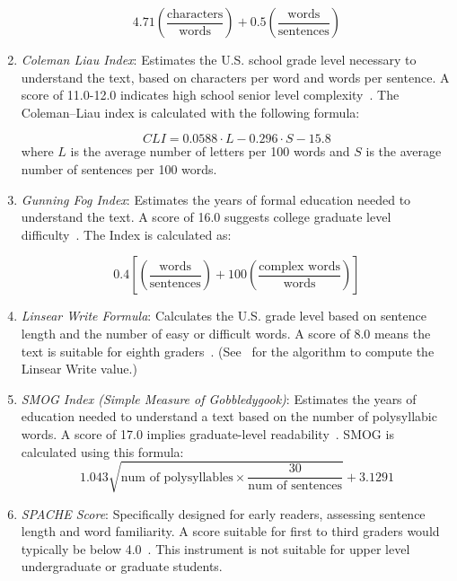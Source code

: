 \begin{enumerate}
	\begin{equation}
		4.71 \left(\frac{\text{characters}}{\text{words}}\right) + 0.5 \left(\frac{\text{words}}{\text{sentences}}\right)
	\end{equation}
	
	\item \textit{Coleman Liau Index}: Estimates the U.S. school grade level necessary to understand the text, based on characters per word and words per sentence. A score of 11.0-12.0 indicates high school senior level complexity~\cite{Coleman_1975}. The Coleman–Liau index is calculated with the following formula:
	
	\begin{equation}
		CLI = 0.0588 \cdot L - 0.296 \cdot S - 15.8
	\end{equation}
	where $L$ is the average number of letters per 100 words and $S$ is the average number of sentences per 100 words.
	 
	\item \textit{Gunning Fog Index}: Estimates the years of formal education needed to understand the text. A score of 16.0 suggests college graduate level difficulty~\cite{Gunning_1952}. The Index is calculated as:
	
	\begin{equation}
		0.4 \left[\left(\frac{\text{words}}{\text{sentences}}\right) + 100 \left(\frac{\text{complex words}}{\text{words}}\right)\right]
	\end{equation}
	
	\item \textit{Linsear Write Formula}: Calculates the U.S. grade level based on sentence length and the number of easy or difficult words. A score of 8.0 means the text is suitable for eighth graders~\cite{Klare_1974}.  (See~\cite{Klare_1974} for the algorithm to compute the Linsear Write value.)
	
	\item \textit{SMOG Index (Simple Measure of Gobbledygook)}: Estimates the years of education needed to understand a text based on the number of polysyllabic words. A score of 17.0 implies graduate-level readability~\cite{McLaughlin_1969_SMOG}. SMOG is calculated using this formula:
	{\footnotesize
		\begin{equation}
			1.043 \sqrt{\text{num of polysyllables} \times \frac{30}{\text{num of sentences}}} + 3.1291
		\end{equation}
	}
	
	\item \textit{SPACHE Score}: Specifically designed for early readers, assessing sentence length and word familiarity. A score suitable for first to third graders would typically be below 4.0~\cite{Spache_1953}.  This instrument is not suitable for upper level undergraduate or graduate students.
\end{enumerate}

